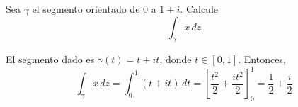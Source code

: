 \begin{exercise}
Sea $\gamma$ el segmento orientado de $0$ a $1 + i$. Calcule
$$\int_\gamma x \, dz$$
\end{exercise}

\begin{solution}
El segmento dado es $\gamma(t) = t + it$, donde $t \in [0, 1]$. Entonces,
$$
\int_\gamma x \, dz
    = \int_0^1 (t + it) \, dt
    = \left[ \frac {t^2} 2 + \frac {it^2} 2 \right]_0^1
    = \frac 12 + \frac i2$$
\end{solution}
